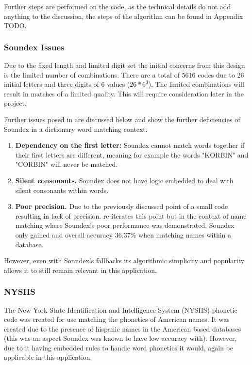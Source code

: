 Further steps are performed on the code, as the technical details do not add anything to the discussion, the steps of the algorithm can be found in Appendix TODO.

\subsubsection{Soundex Issues}

Due to the fixed length and limited digit set the initial concerns from this design is the limited number of combinations. There are a total of 5616 codes due to 26 initial letters and three digits of 6 values ($26 * 6^3$).
The limited combinations will result in matches of a limited quality. This will require consideration later in the project.

Further issues posed in \cite{patman2001soundex} are discussed below and show the further deficiencies of Soundex in a dictionary word matching context. 

\begin{enumerate}
    \item \textbf{Dependency on the first letter:} Soundex cannot match words together if their first letters are different, meaning for example the words "KORBIN" and "CORBIN" will never be matched.

    \item \textbf{Silent consonants.} Soundex does not have logic embedded to deal with silent consonants within words.

    \item \textbf{Poor precision.} Due to the previously discussed point of a small code resulting in lack of precision. \cite{patman2001soundex} re-iterates this point but in the context of name matching where Soundex's poor performance was demonstrated. Soundex only gained and overall accuracy 36.37\% when matching names within a database.
\end{enumerate}


However, even with Soundex's fallbacks its algorithmic simplicity and popularity allows it to still remain relevant in this application.

\subsubsection{NYSIIS}
The New York State Identification and Intelligence System (NYSIIS) phonetic code was created for use matching the phonetics of American names. It was created due to the presence of hispanic names in the American based databases (this was an aspect Soundex was known to have low accuracy with). However, due to it having embedded rules to handle word phonetics it would, again be applicable in this application.

